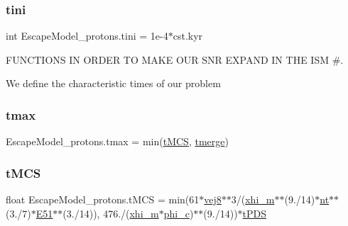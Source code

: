\mbox{\label{namespaceEscapeModel__protons_a8adf11ae890ffc4b073e4b86548465aa}} 
\subsubsection{\texorpdfstring{tini}{tini}}
{\footnotesize\ttfamily int Escape\+Model\+\_\+protons.\+tini = 1e-\/4$\ast$cst.\+kyr}



F\+U\+N\+C\+T\+I\+O\+NS IN O\+R\+D\+ER TO M\+A\+KE O\+UR S\+NR E\+X\+P\+A\+ND IN T\+HE I\+SM \#. 

We define the characteristic times of our problem \mbox{\label{namespaceEscapeModel__protons_a29f4a076c1efb35bb0478e0e8b1f9256}} 
\subsubsection{\texorpdfstring{tmax}{tmax}}
{\footnotesize\ttfamily Escape\+Model\+\_\+protons.\+tmax = min(\hyperlink{namespaceEscapeModel__protons_a584cb289b23163ba3fdbfac10f47442b}{t\+M\+CS}, \hyperlink{namespaceEscapeModel__protons_a2a98ed31beb0bfed830980a90c9fc265}{tmerge})}

\mbox{\label{namespaceEscapeModel__protons_a584cb289b23163ba3fdbfac10f47442b}} 
\subsubsection{\texorpdfstring{t\+M\+CS}{tMCS}}
{\footnotesize\ttfamily float Escape\+Model\+\_\+protons.\+t\+M\+CS = min(61$\ast$\hyperlink{namespaceEscapeModel__protons_a51efb65ca73d6b2db5b62be43dedf522}{vej8}$\ast$$\ast$3/(\hyperlink{namespaceEscapeModel__protons_a268b081a857bf50124b57d6cee248852}{xhi\+\_\+m}$\ast$$\ast$(9./14)$\ast$\hyperlink{namespaceEscapeModel__protons_aea8f96db5e10e84cf033c2f0000e9642}{nt}$\ast$$\ast$(3./7)$\ast$\hyperlink{namespaceEscapeModel__protons_af064ce6137662206b44cb8189188c577}{E51}$\ast$$\ast$(3./14)), 476./(\hyperlink{namespaceEscapeModel__protons_a268b081a857bf50124b57d6cee248852}{xhi\+\_\+m}$\ast$\hyperlink{namespaceEscapeModel__protons_a01a29f96fd38c4ae6fd0e3ad0eb033dc}{phi\+\_\+c})$\ast$$\ast$(9./14))$\ast$\hyperlink{namespaceEscapeModel__protons_a747211c69e34b5cc134d78483bf5a6fd}{t\+P\+DS}}

